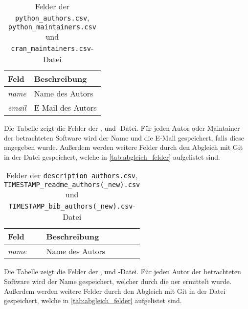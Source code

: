 \begin{table}
    \begin{tabularx}{\textwidth}{XL{10.2cm}}
        \toprule
        \textbf{Feld} & \textbf{Beschreibung} \\ \midrule
        \emph{name}   & Name des Autors       \\
        \emph{email}  & E-Mail des Autors     \\
        \bottomrule
    \end{tabularx}
    \caption[Felder der \texttt{python\_authors.csv}, \texttt{python\_maintainers.csv} und \texttt{cran\_ maintainers.csv}-Datei]{Felder der \texttt{python\_authors.csv}, \texttt{python\_maintainers.csv} und \texttt{cran\_maintainers.csv}-Datei}
    \label{tab:python_authors}
    \small
    Die Tabelle zeigt die Felder der ,  und -Datei. Für jeden Autor oder Maintainer der betrachteten Software wird der Name und die E-Mail gespeichert, falls diese angegeben wurde. Außerdem werden weitere Felder durch den Abgleich mit Git in der Datei gespeichert, welche in \autoref{tab:abgleich_felder} aufgelistet sind.
\end{table}

\begin{table}
    \begin{tabularx}{\textwidth}{XL{10.2cm}}
        \toprule
        \textbf{Feld} & \textbf{Beschreibung} \\ \midrule
        \emph{name}   & Name des Autors       \\
        \bottomrule
    \end{tabularx}
    \caption[Felder der \texttt{description\_authors.csv}, \texttt{TIMESTAMP\_readme\_authors (\_new).csv} und \texttt{TIMESTAMP\_bib\_authors(\_new).csv}-Datei]{Felder der \texttt{description\_authors.csv}, \texttt{TIMESTAMP\_readme\_authors(\_new).csv} und \texttt{TIMESTAMP\_bib\_authors(\_new).csv}-Datei}
    \label{tab:description_authors}
    \small
    Die Tabelle zeigt die Felder der ,  und -Datei. Für jeden Autor der betrachteten Software wird der Name gespeichert, welcher durch die \gls{ner} ermittelt wurde. Außerdem werden weitere Felder durch den Abgleich mit Git in der Datei gespeichert, welche in \autoref{tab:abgleich_felder} aufgelistet sind.
\end{table}


